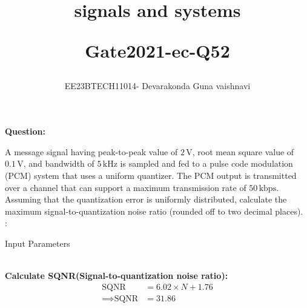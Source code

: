 \documentclass[a4,12pt,onecolumn]{IEEEtran}
\begin{document}
\title{ signals and systems
\vspace{1cm}

Gate2021-ec-Q52}
\author{EE23BTECH11014- Devarakonda Guna vaishnavi}
\maketitle
\textbf{Question:}

A message signal having peak-to-peak value of $2 \, \text{V}$, root mean square value of $0.1 \, \text{V}$, and bandwidth of $5 \, \text{kHz}$ is sampled and fed to a pulse code modulation (PCM) system that uses a uniform quantizer. The PCM output is transmitted over a channel that can support a maximum transmission rate of $50 \, \text{kbps}$. Assuming that the quantization error is uniformly distributed, calculate the maximum signal-to-quantization noise ratio (rounded off to two decimal places).\\
\solution:
\fi
\begin{table}[h!]
    \centering
    
    \caption{Input Parameters}
    \label{table:parameters}
\end{table}\\
\textbf{Calculate SQNR(Signal-to-quantization noise ratio):}
\begin{align} 
\text{SQNR} &= 6.02 \times N + 1.76 
\label{eq:sqnr}\\
\implies \text{SQNR} &= 31.86
\end{align}
\end{document}
